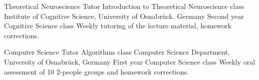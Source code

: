     {Theoretical Neuroscience Tutor}
    {Introduction to Theoretical Neuroscience class}
    {Institute of Cognitive Science, University of Osnabr\"{u}ck, Germany}
    {Second year Cognitive Science class}
    {Weekly tutoring of the lecture material, homework corrections.}

    {Computer Science Tutor}
    {Algorithms class}
    {Computer Science Department, University of Osnabr\"{u}ck, Germany}
    {First year Computer Science class}
    {Weekly oral assessment of 10 2-people groups and homework corrections.}

